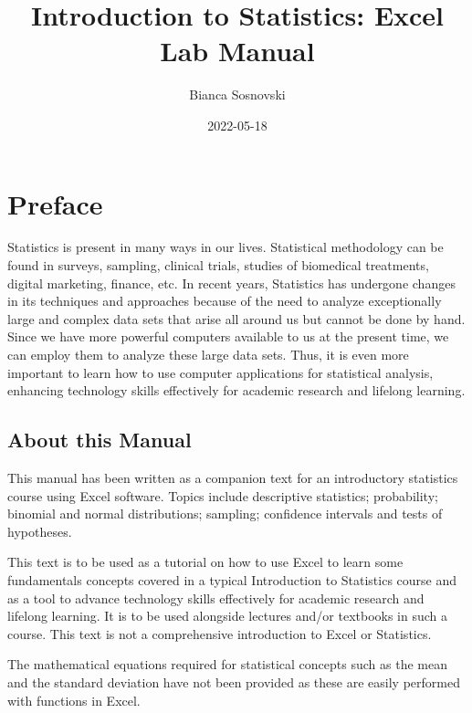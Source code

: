 \documentclass[
]{book}
\title{Introduction to Statistics: Excel Lab Manual}
\author{Bianca Sosnovski}
\date{2022-05-18}
\begin{document}
\maketitle

{
\setcounter{tocdepth}{1}
\tableofcontents
}
\hypertarget{preface}{%
\chapter*{Preface}\label{preface}}

Statistics is present in many ways in our lives. Statistical methodology can be found in surveys, sampling, clinical trials, studies of biomedical treatments, digital marketing, finance, etc. In recent years, Statistics has undergone changes in its techniques and approaches because of the need to analyze exceptionally large and complex data sets that arise all around us but cannot be done by hand. Since we have more powerful computers available to us at the present time, we can employ them to analyze these large data sets. Thus, it is even more important to learn how to use computer applications for statistical analysis, enhancing technology skills effectively for academic research and lifelong learning.

\hypertarget{about-this-manual}{%
\section*{About this Manual}\label{about-this-manual}}

This manual has been written as a companion text for an introductory statistics course using Excel software. Topics include descriptive statistics; probability; binomial and normal distributions; sampling; confidence intervals and tests of hypotheses.

This text is to be used as a tutorial on how to use Excel to learn some fundamentals concepts covered in a typical Introduction to Statistics course and as a tool to advance technology skills effectively for academic research and lifelong learning. It is to be used alongside lectures and/or textbooks in such a course. This text is not a comprehensive introduction to Excel or Statistics.

The mathematical equations required for statistical concepts such as the mean and the standard deviation have not been provided as these are easily performed with functions in Excel.
\end{document}
